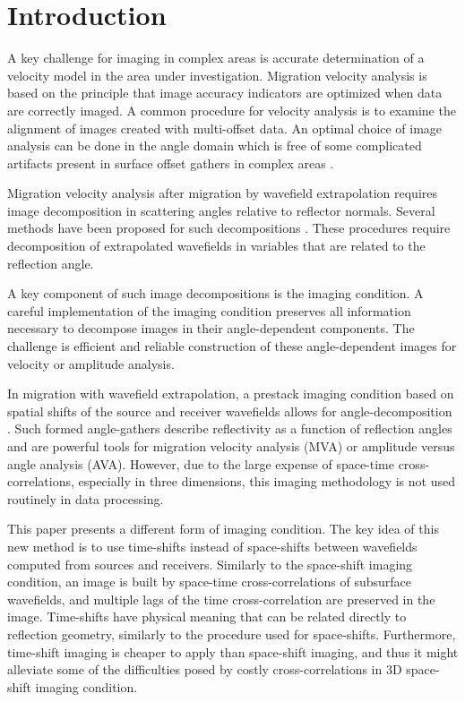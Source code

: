\section{Introduction}
A key challenge for imaging in complex areas is accurate
determination of a velocity model in the area under investigation. 
Migration velocity analysis is based on the principle that
image accuracy indicators are optimized when
data are correctly imaged. 
A common procedure for velocity analysis is to examine the
alignment of images created with multi-offset data.
An optimal choice of image analysis can be done in the 
angle domain which is free of some complicated
artifacts present in surface offset gathers in complex areas
\cite[]{GEO69-02-05620575}.
\par
Migration velocity analysis after migration by wavefield
extrapolation requires image decomposition
in scattering angles relative
to reflector normals. Several methods have 
been proposed for such decompositions
\cite[]{GEO55-09-12231234,
SEG-1999-08240827,
SEG-2000-08300833,
GEO67-03-08830889,
XieWu.adcig,
GEO68-03-10651074,
SEG-2003-08890892,
Fomel.seg.3dadcig,
GEO69-05-12831298}.
These procedures require decomposition of 
extrapolated wavefields in variables that are
related to the reflection angle.

A key component of such image decompositions 
is the imaging condition.
A careful implementation of the imaging condition preserves
all information necessary to decompose images in their
angle-dependent components. 
The challenge is efficient and reliable construction of these
angle-dependent images for velocity or amplitude analysis.

In migration with wavefield extrapolation, a prestack imaging condition
based on spatial shifts of the source and receiver wavefields allows
for angle-decomposition
\cite[]{GEO67-03-08830889,SavaFomel.pag}.
Such formed angle-gathers describe reflectivity as a
function of reflection angles and are powerful tools for migration
velocity analysis (MVA) or amplitude versus angle analysis (AVA).
However, due to the large expense of space-time 
cross-correlations, especially in three dimensions, 
this imaging methodology is not used routinely in data processing.

This paper presents a different form of imaging condition.
The key idea of this new method is to use
time-shifts instead of space-shifts 
between wavefields computed from sources and receivers.
Similarly to the space-shift imaging condition, an image is built by
space-time cross-correlations of subsurface wavefields,
and multiple lags of the time cross-correlation are preserved in the image.
Time-shifts have physical meaning that can be related directly
to reflection geometry, similarly to the procedure used for
space-shifts. 
Furthermore, time-shift imaging is cheaper to apply than space-shift 
imaging, and thus it might alleviate some of the difficulties
posed by costly cross-correlations in 3D space-shift imaging condition.

